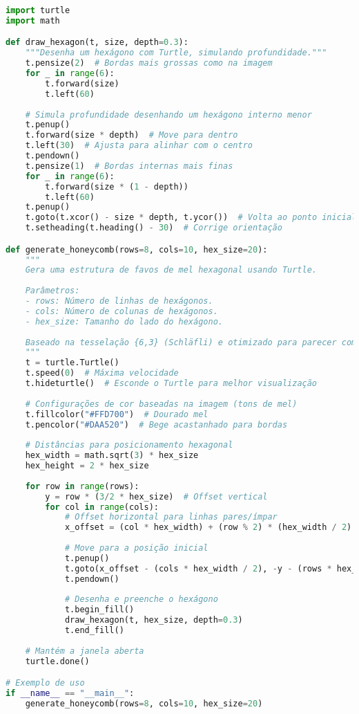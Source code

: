 \documentclass[12pt,a4paper,oneside]{extarticle}
\begin{document}
\begin{lstlisting}[language=python]
import turtle
import math

def draw_hexagon(t, size, depth=0.3):
    """Desenha um hexágono com Turtle, simulando profundidade."""
    t.pensize(2)  # Bordas mais grossas como na imagem
    for _ in range(6):
        t.forward(size)
        t.left(60)
    
    # Simula profundidade desenhando um hexágono interno menor
    t.penup()
    t.forward(size * depth)  # Move para dentro
    t.left(30)  # Ajusta para alinhar com o centro
    t.pendown()
    t.pensize(1)  # Bordas internas mais finas
    for _ in range(6):
        t.forward(size * (1 - depth))
        t.left(60)
    t.penup()
    t.goto(t.xcor() - size * depth, t.ycor())  # Volta ao ponto inicial
    t.setheading(t.heading() - 30)  # Corrige orientação

def generate_honeycomb(rows=8, cols=10, hex_size=20):
    """
    Gera uma estrutura de favos de mel hexagonal usando Turtle.
    
    Parâmetros:
    - rows: Número de linhas de hexágonos.
    - cols: Número de colunas de hexágonos.
    - hex_size: Tamanho do lado do hexágono.
    
    Baseado na tesselação {6,3} (Schläfli) e otimizado para parecer com a imagem.
    """
    t = turtle.Turtle()
    t.speed(0)  # Máxima velocidade
    t.hideturtle()  # Esconde o Turtle para melhor visualização
    
    # Configurações de cor baseadas na imagem (tons de mel)
    t.fillcolor("#FFD700")  # Dourado mel
    t.pencolor("#DAA520")  # Bege acastanhado para bordas
    
    # Distâncias para posicionamento hexagonal
    hex_width = math.sqrt(3) * hex_size
    hex_height = 2 * hex_size
    
    for row in range(rows):
        y = row * (3/2 * hex_size)  # Offset vertical
        for col in range(cols):
            # Offset horizontal para linhas pares/ímpar
            x_offset = (col * hex_width) + (row % 2) * (hex_width / 2)
            
            # Move para a posição inicial
            t.penup()
            t.goto(x_offset - (cols * hex_width / 2), -y - (rows * hex_height / 4))  # Centraliza
            t.pendown()
            
            # Desenha e preenche o hexágono
            t.begin_fill()
            draw_hexagon(t, hex_size, depth=0.3)
            t.end_fill()
    
    # Mantém a janela aberta
    turtle.done()

# Exemplo de uso
if __name__ == "__main__":
    generate_honeycomb(rows=8, cols=10, hex_size=20)
\end{lstlisting}
\end{document}
